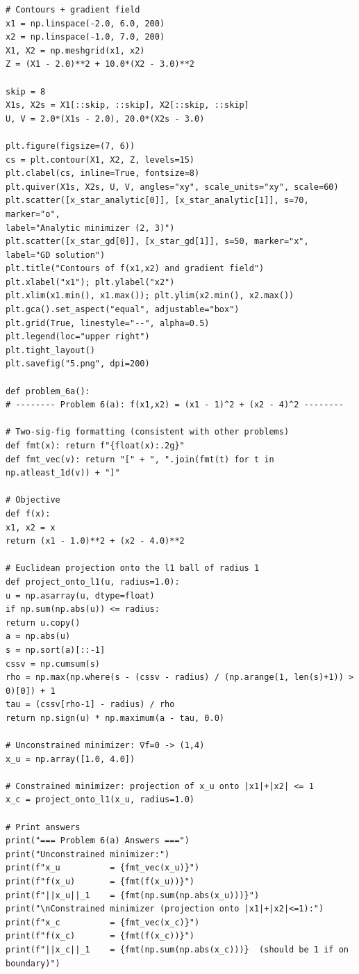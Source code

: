 \documentclass[11pt]{article}
\begin{document}
\begin{lstlisting}
# Contours + gradient field
x1 = np.linspace(-2.0, 6.0, 200)
x2 = np.linspace(-1.0, 7.0, 200)
X1, X2 = np.meshgrid(x1, x2)
Z = (X1 - 2.0)**2 + 10.0*(X2 - 3.0)**2

skip = 8
X1s, X2s = X1[::skip, ::skip], X2[::skip, ::skip]
U, V = 2.0*(X1s - 2.0), 20.0*(X2s - 3.0)

plt.figure(figsize=(7, 6))
cs = plt.contour(X1, X2, Z, levels=15)
plt.clabel(cs, inline=True, fontsize=8)
plt.quiver(X1s, X2s, U, V, angles="xy", scale_units="xy", scale=60)
plt.scatter([x_star_analytic[0]], [x_star_analytic[1]], s=70, marker="o",
label="Analytic minimizer (2, 3)")
plt.scatter([x_star_gd[0]], [x_star_gd[1]], s=50, marker="x", label="GD solution")
plt.title("Contours of f(x1,x2) and gradient field")
plt.xlabel("x1"); plt.ylabel("x2")
plt.xlim(x1.min(), x1.max()); plt.ylim(x2.min(), x2.max())
plt.gca().set_aspect("equal", adjustable="box")
plt.grid(True, linestyle="--", alpha=0.5)
plt.legend(loc="upper right")
plt.tight_layout()
plt.savefig("5.png", dpi=200)

def problem_6a():
# -------- Problem 6(a): f(x1,x2) = (x1 - 1)^2 + (x2 - 4)^2 --------

# Two-sig-fig formatting (consistent with other problems)
def fmt(x): return f"{float(x):.2g}"
def fmt_vec(v): return "[" + ", ".join(fmt(t) for t in np.atleast_1d(v)) + "]"

# Objective
def f(x):
x1, x2 = x
return (x1 - 1.0)**2 + (x2 - 4.0)**2

# Euclidean projection onto the l1 ball of radius 1
def project_onto_l1(u, radius=1.0):
u = np.asarray(u, dtype=float)
if np.sum(np.abs(u)) <= radius:
return u.copy()
a = np.abs(u)
s = np.sort(a)[::-1]
cssv = np.cumsum(s)
rho = np.max(np.where(s - (cssv - radius) / (np.arange(1, len(s)+1)) > 0)[0]) + 1
tau = (cssv[rho-1] - radius) / rho
return np.sign(u) * np.maximum(a - tau, 0.0)

# Unconstrained minimizer: ∇f=0 -> (1,4)
x_u = np.array([1.0, 4.0])

# Constrained minimizer: projection of x_u onto |x1|+|x2| <= 1
x_c = project_onto_l1(x_u, radius=1.0)

# Print answers
print("=== Problem 6(a) Answers ===")
print("Unconstrained minimizer:")
print(f"x_u          = {fmt_vec(x_u)}")
print(f"f(x_u)       = {fmt(f(x_u))}")
print(f"||x_u||_1    = {fmt(np.sum(np.abs(x_u)))}")
print("\nConstrained minimizer (projection onto |x1|+|x2|<=1):")
print(f"x_c          = {fmt_vec(x_c)}")
print(f"f(x_c)       = {fmt(f(x_c))}")
print(f"||x_c||_1    = {fmt(np.sum(np.abs(x_c)))}  (should be 1 if on boundary)")


\end{lstlisting}
\end{document}
